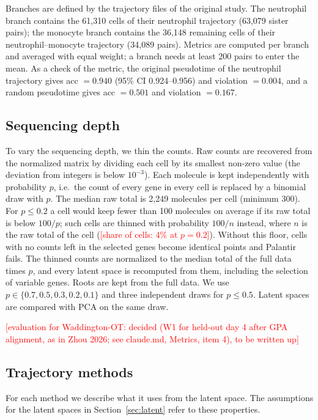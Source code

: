 \documentclass[10pt,a4paper,twocolumn]{article}
\newcommand{\todo}[1]{\textcolor{red}{[#1]}}
\begin{document}
Branches are defined by the trajectory files of the original study. The neutrophil branch
contains the 61{,}310 cells of their neutrophil trajectory (63{,}079 sister pairs); the monocyte
branch contains the 36{,}148 remaining cells of their neutrophil--monocyte trajectory
(34{,}089 pairs). Metrics are computed per branch and averaged with equal weight; a branch needs
at least 200 pairs to enter the mean. As a check of the metric, the original pseudotime of the
neutrophil trajectory gives acc $=0.940$ (95\% CI 0.924--0.956) and violation $=0.004$, and a
random pseudotime gives acc $=0.501$ and violation $=0.167$.

\subsection{Sequencing depth}
\label{sec:thin}
To vary the sequencing depth, we thin the counts. Raw counts are recovered from the normalized
matrix by dividing each cell by its smallest non-zero value (the deviation from integers is below
$10^{-3}$). Each molecule is kept independently with probability $p$, i.e.\ the count of every
gene in every cell is replaced by a binomial draw with $p$. The median raw total is 2{,}249
molecules per cell (minimum 300). For $p \le 0.2$ a cell would keep fewer than 100 molecules on
average if its raw total is below $100/p$; such cells are thinned with probability $100/n$
instead, where $n$ is the raw total of the cell (\todo{share of cells: 4\% at $p=0.2$}). Without
this floor, cells with no counts left in the selected genes become identical points and Palantir
fails. The thinned counts are normalized to the median total of the full data times $p$, and
every latent space is recomputed from them, including the selection of variable genes. Roots
are kept from the full data. We use $p \in \{0.7, 0.5, 0.3, 0.2, 0.1\}$ and three independent
draws for $p \le 0.5$. Latent spaces are compared with PCA on the same draw.

\todo{evaluation for Waddington-OT: decided (W1 for held-out day 4 after GPA alignment, as in Zhou 2026; see claude.md, Metrics, item 4), to be written up}

\subsection{Trajectory methods}
For each method we describe what it uses from the latent space. The assumptions for the latent
spaces in Section~\ref{sec:latent} refer to these properties.
\end{document}
